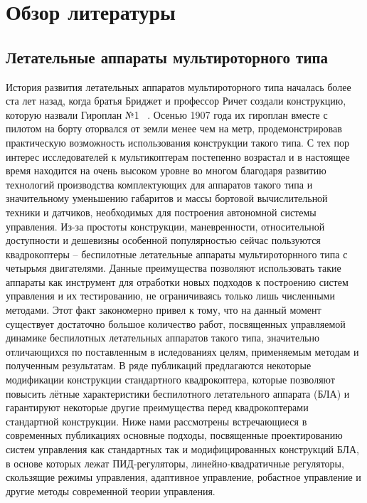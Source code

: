 \documentclass[a4paper,14pt,oneside,openany]{memoir}
\date{}
\author{}
\begin{document}
	
	\chapter{Обзор литературы} \label{review}
	
	\section{Летательные аппараты мультироторного типа} \label{review_s1}
	
	История развития летательных аппаратов мультироторного типа началась более ста лет назад, когда братья Бриджет и профессор Ричет создали конструкцию, которую назвали Гироплан №1 ~\cite{Leishman02, Leishman01}. Осенью 1907 года их гироплан вместе с пилотом на борту оторвался от земли менее чем на метр, продемонстрировав практическую возможность использования конструкции такого типа. С тех пор интерес исследователей к мультикоптерам постепенно возрастал и в настоящее время находится на очень высоком уровне во многом благодаря развитию технологий производства комплектующих для аппаратов такого типа и значительному уменьшению габаритов и массы бортовой вычислительной техники и датчиков, необходимых для построения автономной системы управления. Из-за простоты конструкции, маневренности, относительной доступности и дешевизны особенной популярностью сейчас пользуются квадрокоптеры -- беспилотные летательные аппараты мультироторнного типа с четырьмя двигателями. Данные преимущества позволяют использовать такие аппараты как инструмент для отработки новых подходов к построению систем управления и их тестированию, не ограничиваясь только лишь численными методами. Этот факт закономерно привел к тому, что на данный момент существует достаточно большое количество работ, посвященных управляемой динамике беспилотных летательных аппаратов такого типа, значительно отличающихся по поставленным в иследованиях целям, применяемым методам и полученным результатам. В ряде публикаций предлагаются некоторые модификации конструкции стандартного квадрокоптера, которые позволяют повысить лётные характеристики беспилотного летательного аппарата (БЛА) и гарантируют некоторые другие преимущества перед квадрокоптерами стандартной конструкции. Ниже нами рассмотрены встречающиеся в современных публикациях основные подходы, посвященные проектированию систем управления как стандартных так и модифицированных конструкций БЛА, в основе которых лежат ПИД-регуляторы, линейно-квадратичные регуляторы, скользящие режимы управления, адаптивное управление, робастное управление и другие методы современной теории управления.
\end{document}
